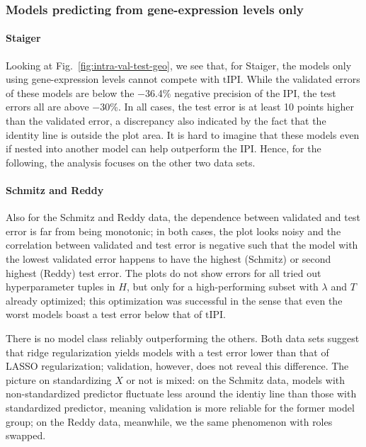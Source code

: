 \subsubsection{Models predicting from gene-expression levels only}



\paragraph{Staiger}
Looking at Fig.\ \ref{fig:intra-val-test-geo}, we see that, for Staiger, the models only using 
gene-expression levels cannot compete with $\text{tIPI}$. While the validated errors of these models are 
below the \num{-36.4}\% negative precision of the IPI, the test errors all are above \num{-30}\%. 
In all cases, the test error is at least 10 points higher than the validated error, a discrepancy 
also indicated by the fact that the identity line is outside the plot area. It is hard to imagine that 
these models even if nested into another model can help outperform the IPI. Hence, for the 
following, the analysis focuses on the other two data sets.

\paragraph{Schmitz and Reddy}
Also for the Schmitz and Reddy data, the dependence between validated and test error is far from 
being monotonic; in both cases, the plot looks noisy and the correlation between validated and test 
error is negative such that the model with the lowest validated error happens to have the highest 
(Schmitz) or second highest (Reddy) test error. The plots do not show errors for all tried out 
hyperparameter tuples in $H$, but only for a high-performing subset with $\lambda$ and $T$ already 
optimized; this optimization was successful in the sense that even the worst models boast a test 
error below that of $\text{tIPI}$.

There is no model class reliably outperforming the others. Both data sets suggest that ridge 
regularization yields models with a test error lower than that of LASSO regularization; validation, 
however, does not reveal this difference. The picture on standardizing $X$ or not is mixed: on the 
Schmitz data, models with non-standardized predictor fluctuate less around the identiy line than 
those with standardized predictor, meaning validation is more reliable for the former model group;
on the Reddy data, meanwhile, we the same phenomenon with roles swapped.

